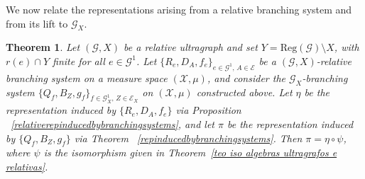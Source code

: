 \documentclass[12pt, reqno]{amsart}
\newtheorem{theorem}{Theorem}[section]
\theoremstyle{definition}
\theoremstyle{remark}
\numberwithin{equation}{section}
\begin{document}
We now relate the representations arising from a relative branching system and from its
lift to $\mathcal{G}_X$.
\begin{theorem}\label{DiagramadeBS}
Let $(\mathcal{G}, X)$ be a relative ultragraph and set $Y=\mathrm{Reg}(\mathcal{G})\setminus X$,
with $r(e)\cap Y$ finite for all $e \in \mathcal{G}^1$. Let
$\{R_e,D_A,f_e\}_{e\in \mathcal{G}^1,\, A\in \mathcal{E}}$ be a $(\mathcal{G}, X)$-relative
branching system on a measure space $(\mathcal{X},\mu)$, and consider the
$\mathcal{G}_X$-branching system $\{Q_f, B_Z, g_f\}_{f \in \mathcal{G}_X^1,\, Z \in \mathcal{E}_X}$
on $(\mathcal{X},\mu)$ constructed above. Let $\eta$ be the representation induced by
$\{R_e,D_A,f_e\}$ via Proposition ~\ref{relativerepinducedbybranchingsystems}, and let $\pi$ be the
representation induced by $\{Q_f, B_Z, g_f\}$ via Theorem ~\ref{repinducedbybranchingsystems}.
Then $\pi=\eta \circ \psi$, where $\psi$ is the isomorphism given in
Theorem~\ref{teo iso algebras ultragrafos e relativas}. 
\end{theorem}
\end{document}
